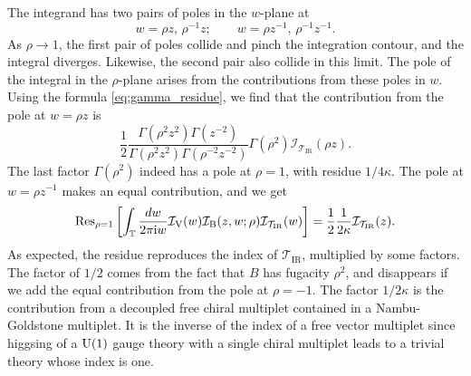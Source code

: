The integrand has two pairs of poles in the $w$-plane at
\begin{equation}
    w  =  \rho z,  \,  \rho^{-1}z;
    \quad\quad
    w  =  \rho z^{-1},  \,  \rho^{-1}z^{-1}.
\end{equation}
As $\rho\to 1$, the first pair of poles collide and pinch
the integration contour, and the integral diverges. Likewise, the
second pair also collide in this limit. The pole of the integral in
the $\rho$-plane arises from the contributions from these poles in
$w$. Using the formula \eqref{eq:gamma_residue}, we find that the contribution from
the pole at $w=\rho z$ is
\begin{equation}
    \frac{1}{2}
    \frac{\Gamma(\rho^{2}z^{2})\Gamma(z^{-2})}{\Gamma(\rho^{2}z^{2})\Gamma(\rho^{-2}z^{-2})}
    \Gamma(\rho^{2})
    \mathcal{I}_{\mathcal{T}_{\mathrm{IR}}}(\rho z).
\end{equation}
The last factor $\Gamma(\rho^{2})$ indeed has a pole at $\rho=1$,
with residue $1/4\kappa$. The pole at $w=\rho z^{-1}$ makes an equal
contribution, and we get
\begin{equation}
    \mathrm{Res}_{\rho=1}
    \left[
      \int_{\mathbb{T}}\frac{dw}{2\pi \mathrm{i} w}
      \mathcal{I}_{\mathrm{V}}(w)
      \mathcal{I}_{\mathrm{B}}(z,w;\rho)
      \mathcal{I}_{\mathcal{T}_{\mathrm{IR}}}(w)
    \right]
      =
        \frac{1}{2}  \frac{1}{2\kappa}
        \mathcal{I}_{\mathcal{T}_{\mathrm{IR}}}(z).
\end{equation}
As expected, the residue reproduces the index of $\mathcal{T}_{\mathrm{IR}}$,
multiplied by some factors. The factor of $1/2$ comes from the fact
that $B$ has fugacity $\rho^{2}$, and disappears if we add the equal
contribution from the pole at $\rho=-1$. The factor $1/2\kappa$
is the contribution from a decoupled free chiral multiplet contained
in a Nambu-Goldstone multiplet. It is the inverse of the index of
a free vector multiplet since higgsing of a $\mathrm{U}(1)$ gauge theory with
a single chiral multiplet leads to a trivial theory whose index is
one.

